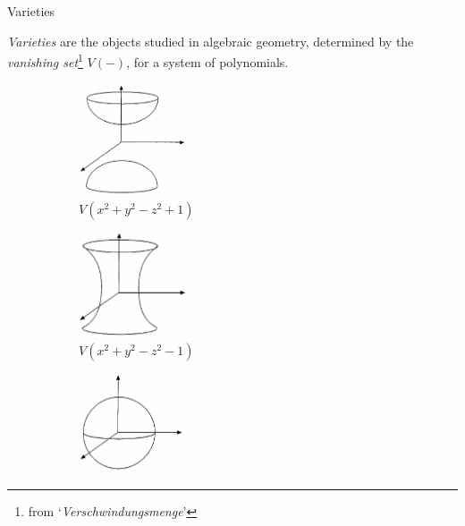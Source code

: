 \begin{frame}{Varieties}
    
    \emph{Varieties} are the objects studied in algebraic geometry, determined by the \emph{vanishing set}\footnote{from `\emph{Verschwindungsmenge}'} $V(-)$, for a system of polynomials.

\begin{figure}
        \centering
        \begin{subfigure}[b]{0.475\textwidth}
            \centering
            \includegraphics[width=0.35\textwidth]{resources/two-hyperboloid}
            \caption[]%
            {{\small $V(x^{2} + y^{2} - z^{2} + 1)$}}    
        \end{subfigure}
        \hfill
        \begin{subfigure}[b]{0.475\textwidth}  
            \centering 
            \includegraphics[width=0.35\textwidth]{resources/one-hyperboloid}
            \caption[]%
            {{\small $V(x^{2} + y^{2} - z^{2} - 1)$}}    
        \end{subfigure}
        \hfill
        \begin{subfigure}[b]{0.475\textwidth}   
            \centering 
            \includegraphics[width=0.35\textwidth]{resources/sphere}

\end{subfigure}
\end{figure}
\end{frame}
